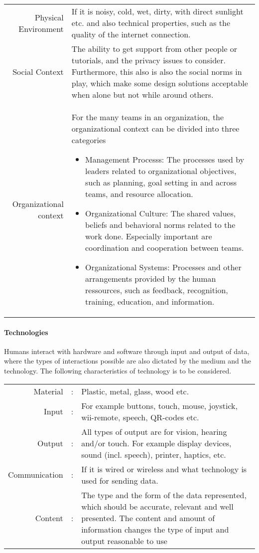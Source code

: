 \noindent
\begin{longtable}{r>{\raggedright\arraybackslash}p{}}
  Physical Environment &
  If it is noisy, cold, wet, dirty, with direct sunlight etc. and also technical properties, such as the quality of the internet connection.
  \\
  Social Context &
  The ability to get support from other people or tutorials, and the privacy issues to consider. Furthermore, this also is  also the social norms in play, which make some design solutions acceptable when alone but not while around others. 
  \\
  Organizational context &
  For the many teams in an organization, the organizational context can be divided into three categories \cite[p. 286]{doolen}
  \begin{itemize}
    \item Management Processs:
      The processes used by leaders related to organizational objectives, such as planning, goal setting in and across teams, and resource allocation.

    \item Organizational Culture:
      The shared values, beliefs and behavioral norms related to the work done. Especially important are coordination and cooperation between teams.
      
    \item Organizational Systems:
      Processes and other arrangements provided by the human ressources, such as feedback, recognition, training, education, and information.
  \end{itemize}
\end{longtable}

\paragraph{Technologies}
Humans interact with hardware and software through input and output of data, where the types of interactions possible are also dictated by the medium and the technology. The following characteristics of technology is to be considered. \cite[p. 36-43]{nyon14}

\noindent
\begin{longtable}{rc>{\raggedright\arraybackslash}p{}}
  Material & : &
  Plastic, metal, glass, wood etc.
  \\
  Input & : &
  For example buttons, touch, mouse, joystick, wii-remote, speech, QR-codes etc.
  \\
  Output & : &
  All types of output are for vision, hearing and/or touch. For example display devices, sound (incl. speech), printer, haptics,  etc.
  \\
  Communication & : &
  If it is wired or wireless and what technology is used for sending data.
  \\
  Content & : &
  The type and the form of the data represented, which should be accurate, relevant and well presented. The content and amount of information changes the type of input and output reasonable to use
\end{longtable}
